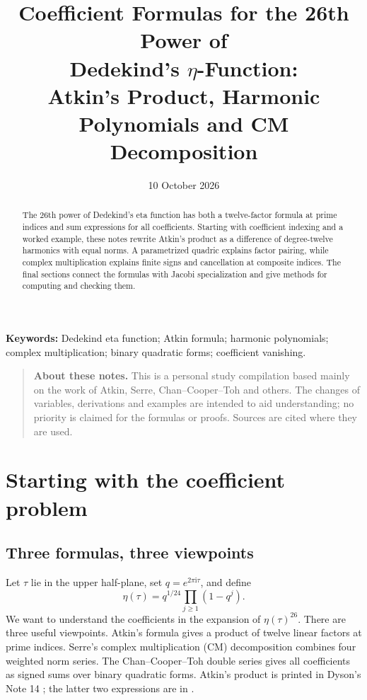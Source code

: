 \documentclass[a4paper,11pt]{article}
\title{\textbf{Coefficient Formulas for the 26th Power of\\
Dedekind's \(\eta\)-Function:\\
Atkin's Product, Harmonic Polynomials and CM Decomposition}}
\author{}
\date{10 October 2026}
\theoremstyle{definition}
\newcommand{\iu}{\mathrm i}
\begin{document}
\maketitle
\vspace{-1.8em}
\begin{abstract}
The 26th power of Dedekind's eta function has both a twelve-factor formula
at prime indices and sum expressions for all coefficients.
Starting with coefficient indexing and a worked example, these notes
rewrite Atkin's product as a difference of degree-twelve harmonics with equal norms.
A parametrized quadric explains factor pairing, while complex multiplication
explains finite signs and cancellation at composite indices.
The final sections connect the formulas with Jacobi specialization
and give methods for computing and checking them.
\end{abstract}
\noindent\textbf{Keywords:} Dedekind eta function; Atkin formula;
harmonic polynomials; complex multiplication; binary quadratic forms;
coefficient vanishing.

\begin{quote}\small
\textbf{About these notes.} This is a personal study compilation based mainly on
the work of Atkin, Serre, Chan--Cooper--Toh and others.
The changes of variables, derivations and examples are intended to aid understanding;
no priority is claimed for the formulas or proofs. Sources are cited where they are used.
\end{quote}

\section{Starting with the coefficient problem}
\subsection{Three formulas, three viewpoints}
Let \(\tau\) lie in the upper half-plane, set \(q=e^{2\pi\iu\tau}\), and define
\begin{equation}\label{eq:eta}
 \eta(\tau)=q^{1/24}\prod_{j\geq1}(1-q^j).
\end{equation}
We want to understand the coefficients in the expansion of \(\eta(\tau)^{26}\).
There are three useful viewpoints.
Atkin's formula gives a product of twelve linear factors at prime indices.
Serre's complex multiplication (CM) decomposition combines four weighted norm series.
The Chan--Cooper--Toh double series gives all coefficients as signed sums
over binary quadratic forms.
Atkin's product is printed in Dyson's Note 14 \cite{Dyson1972};
the latter two expressions are in \cite{Serre1985,ChanCooperToh2006}.
\end{document}
